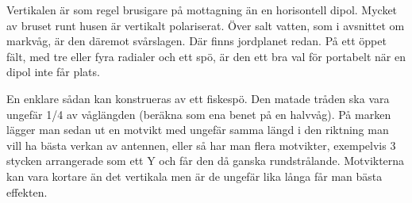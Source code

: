 Vertikalen är som regel brusigare på mottagning än en horisontell
dipol. Mycket av bruset runt husen är vertikalt polariserat. Över
salt vatten, som i avsnittet om markvåg, är den däremot
svårslagen. Där finns jordplanet redan. På ett öppet fält, med tre
eller fyra radialer och ett spö, är den ett bra val för portabelt när
en dipol inte får plats.

En enklare sådan kan konstrueras av ett fiskespö. Den matade tråden
ska vara ungefär 1/4 av våglängden (beräkna som ena benet på en
halvvåg). På marken lägger man sedan ut en motvikt med ungefär samma
längd i den riktning man vill ha bästa verkan av antennen, eller så
har man flera motvikter, exempelvis 3 stycken arrangerade som ett Y
och får den då ganska rundstrålande. Motvikterna kan vara kortare än
det vertikala men är de ungefär lika långa får man bästa effekten.

